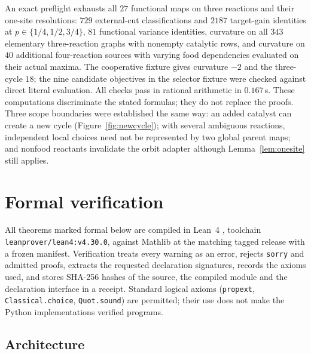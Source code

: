 \documentclass[11pt,a4paper]{article}
\theoremstyle{plain}
\theoremstyle{definition}
\theoremstyle{remark}
\newcommand{\lean}[1]{\texttt{#1}}
\begin{document}
An exact preflight exhausts all $27$ functional maps on three reactions and their one-site resolutions: $729$ external-cut classifications and $2187$ target-gain identities at $p\in\{1/4,1/2,3/4\}$, $81$ functional variance identities, curvature on all $343$ elementary three-reaction graphs with nonempty catalytic rows, and curvature on $40$ additional four-reaction sources with varying food dependencies evaluated on their actual maxima. The cooperative fixture gives curvature $-2$ and the three-cycle $18$; the nine candidate objectives in the selector fixture were checked against direct literal evaluation. All checks pass in rational arithmetic in $0.167$\,s. These computations discriminate the stated formulas; they do not replace the proofs. Three scope boundaries were established the same way: an added catalyst can create a new cycle (Figure~\ref{fig:newcycle}); with several ambiguous reactions, independent local choices need not be represented by two global parent maps; and nonfood reactants invalidate the orbit adapter although Lemma~\ref{lem:onesite} still applies.

\section{Formal verification}\label{sec:formal}

\begin{sloppypar}
All theorems marked formal below are compiled in Lean~4 \citep{demoura2021}, toolchain \lean{leanprover/lean4:v4.30.0}, against Mathlib \citep{mathlib2020} at the matching tagged release with a frozen manifest. Verification treats every warning as an error, rejects \lean{sorry} and admitted proofs, extracts the requested declaration signatures, records the axioms used, and stores SHA-256 hashes of the source, the compiled module and the declaration interface in a receipt. Standard logical axioms (\lean{propext}, \lean{Classical.choice}, \lean{Quot.sound}) are permitted; their use does not make the Python implementations verified programs.
\end{sloppypar}

\subsection{Architecture}
\end{document}
